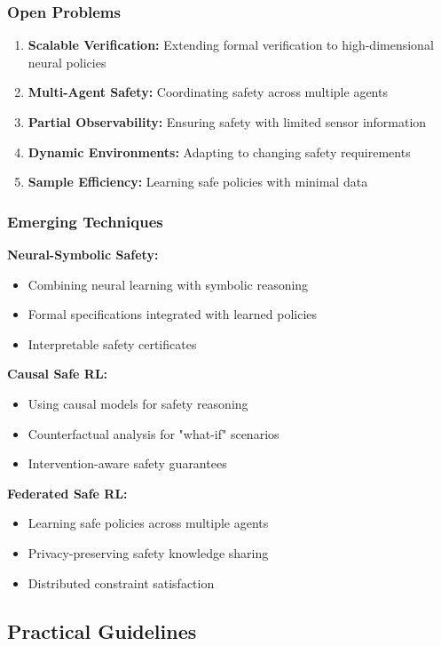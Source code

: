\documentclass[12pt]{article}
\begin{document}
{{{{\subsubsection{Open Problems}

\begin{enumerate}
\item \textbf{Scalable Verification:} Extending formal verification to high-dimensional neural policies
\item \textbf{Multi-Agent Safety:} Coordinating safety across multiple agents
\item \textbf{Partial Observability:} Ensuring safety with limited sensor information
\item \textbf{Dynamic Environments:} Adapting to changing safety requirements
\item \textbf{Sample Efficiency:} Learning safe policies with minimal data
\end{enumerate}

\subsubsection{Emerging Techniques}

\textbf{Neural-Symbolic Safety:}
\begin{itemize}
\item Combining neural learning with symbolic reasoning
\item Formal specifications integrated with learned policies
\item Interpretable safety certificates
\end{itemize}

\textbf{Causal Safe RL:}
\begin{itemize}
\item Using causal models for safety reasoning
\item Counterfactual analysis for "what-if" scenarios
\item Intervention-aware safety guarantees
\end{itemize}

\textbf{Federated Safe RL:}
\begin{itemize}
\item Learning safe policies across multiple agents
\item Privacy-preserving safety knowledge sharing
\item Distributed constraint satisfaction
\end{itemize}

\subsection{Practical Guidelines}

}}}}
\end{document}
